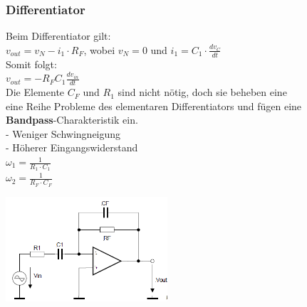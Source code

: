         \subsubsection{Differentiator}
			\begin{minipage}[b]{12cm}
           		Beim Differentiator gilt: \\ 
           		$v_{out}=v_N-i_1 \cdot R_F$, wobei $v_N=0$ und $i_1=C_1 \cdot \frac{dv_C}{dt}$\\
           		Somit folgt:\\
           		$v_{out}=-R_FC_1 \frac{dv_{in}}{dt}$\\
           		
           		Die Elemente $C_F$ und $R_1$ sind nicht nötig, doch sie beheben eine\\
           		eine Reihe Probleme des elementaren Differentiators und fügen eine \\
           		{\bf Bandpass}-Charakteristik ein. \\
           		- Weniger Schwingneigung \\
           		- Höherer Eingangswiderstand \\
           		$\omega_1 = \frac{1}{R_1 \cdot C_1}$\\
           		$\omega_2 = \frac{1}{R_F \cdot C_F}$\\      
           	\end{minipage}
			\begin{minipage}[t]{6cm}
           		\includegraphics[width=6cm]{./images/differentiator.png}
           	\end{minipage}

